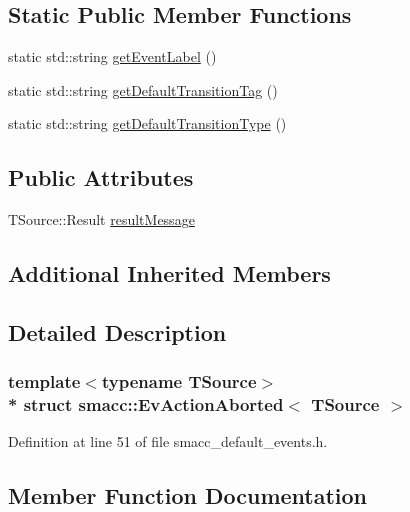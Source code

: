 \subsection*{Static Public Member Functions}
\begin{DoxyCompactItemize}
\item 
static std\+::string \hyperlink{structsmacc_1_1EvActionAborted_a29d1bc3c538ac63eb0a21098eb499aa8}{get\+Event\+Label} ()
\item 
static std\+::string \hyperlink{structsmacc_1_1EvActionAborted_af3cbd568191482ec6b2345113a8dd72e}{get\+Default\+Transition\+Tag} ()
\item 
static std\+::string \hyperlink{structsmacc_1_1EvActionAborted_a990d4b8589ef42ec661951819d37fe3e}{get\+Default\+Transition\+Type} ()
\end{DoxyCompactItemize}
\subsection*{Public Attributes}
\begin{DoxyCompactItemize}
\item 
T\+Source\+::\+Result \hyperlink{structsmacc_1_1EvActionAborted_a9f8260ec0ec693b04a518cd82d716115}{result\+Message}
\end{DoxyCompactItemize}
\subsection*{Additional Inherited Members}


\subsection{Detailed Description}
\subsubsection*{template$<$typename T\+Source$>$\\*
struct smacc\+::\+Ev\+Action\+Aborted$<$ T\+Source $>$}



Definition at line 51 of file smacc\+\_\+default\+\_\+events.\+h.



\subsection{Member Function Documentation}
